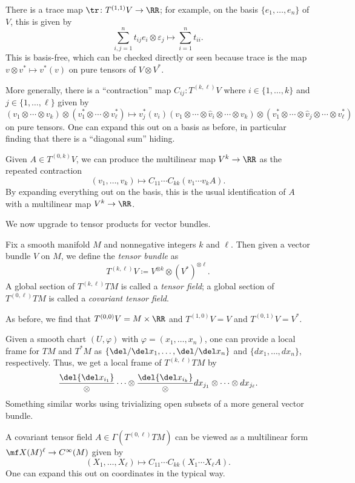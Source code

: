 \documentclass[../notes.tex]{subfiles}
\begin{document}
\begin{remark}
	There is a trace map $\tr\colon T^{(1,1)}V\to\RR$; for example, on the basis $\{e_1,\ldots,e_n\}$ of $V$, this is given by
	\[\sum_{i,j=1}^nt_{ij}e_i\otimes\varepsilon_j\mapsto\sum_{i=1}^nt_{ii}.\]
	This is basis-free, which can be checked directly or seen because trace is the map $v\otimes v^*\mapsto v^*(v)$ on pure tensors of $V\otimes V^*$.
\end{remark}
\begin{remark}
	More generally, there is a ``contraction'' map $C_{ij}\colon T^{(k,\ell)}V$ where $i\in\{1,\ldots,k\}$ and $j\in\{1,\ldots,\ell\}$ given by
	\[(v_1\otimes\cdots\otimes v_k)\otimes(v_1^*\otimes\cdots\otimes v_\ell^*)\mapsto v_j^*(v_i)(v_1\otimes\cdots\otimes\widehat v_i\otimes\cdots\otimes v_k)\otimes(v_1^*\otimes\cdots\otimes\widehat v_j\otimes\cdots\otimes v_\ell^*)\]
	on pure tensors. One can expand this out on a basis as before, in particular finding that there is a ``diagonal sum'' hiding.
\end{remark}
\begin{example}
	Given $A\in T^{(0,k)}V$, we can produce the multilinear map $V^k\to\RR$ as the repeated contraction
	\[(v_1,\ldots,v_k)\mapsto C_{11}\cdots C_{kk}(v_1\cdots v_kA).\]
	By expanding everything out on the basis, this is the usual identification of $A$ with a multilinear map $V^k\to\RR$.
\end{example}
We now upgrade to tensor products for vector bundles.
\begin{definition}
	Fix a smooth manifold $M$ and nonnegative integers $k$ and $\ell$. Then given a vector bundle $V$ on $M$, we define the \textit{tensor bundle} as
	\[T^{(k,\ell)}V\coloneqq V^{\otimes k}\otimes(V^*)^{\otimes\ell}.\]
	A global section of $T^{(k,\ell)}TM$ is called a \textit{tensor field}; a global section of $T^{(0,\ell)}TM$ is called a \textit{covariant tensor field}.
\end{definition}
\begin{example}
	As before, we find that $T^{(0,0)}V=M\times\RR$ and $T^{(1,0)}V=V$ and $T^{(0,1)}V=V^*$.
\end{example}
\begin{remark}
	Given a smooth chart $(U,\varphi)$ with $\varphi=(x_1,\ldots,x_n)$, one can provide a local frame for $TM$ and $T^*M$ as $\{\del/\del x_1,\ldots,\del/\del x_n\}$ and $\{dx_1,\ldots,dx_n\}$, respectively. Thus, we get a local frame of $T^{(k,\ell)}TM$ by
	\[\frac\del{\del x_{i_1}}\otimes\cdots\otimes\frac\del{\del x_{i_k}}\otimes dx_{j_1}\otimes\cdots\otimes dx_{j_\ell}.\]
	Something similar works using trivializing open subsets of a more general vector bundle.
\end{remark}
\begin{remark}
	A covariant tensor field $A\in\Gamma\left(T^{(0,\ell)}TM\right)$ can be viewed as a multilinear form $\mf X(M)^\ell\to C^\infty(M)$ given by
	\[(X_1,\ldots,X_\ell)\mapsto C_{11}\cdots C_{kk}(X_1\cdots X_\ell A).\]
	One can expand this out on coordinates in the typical way.
\end{remark}
\end{document}
